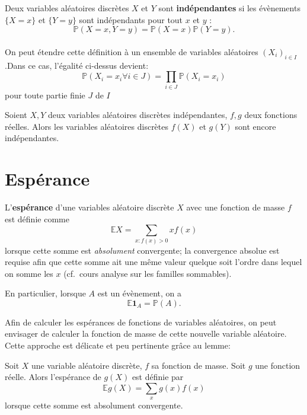 \documentclass[]{book}
\theoremstyle{definition}
\theoremstyle{definition}
\theoremstyle{definition}
\theoremstyle{remark}
\let\BeginKnitrBlock\begin \let\EndKnitrBlock\end
\begin{document}
\BeginKnitrBlock{definition}
\protect\hypertarget{def:unnamed-chunk-8}{}{\label{def:unnamed-chunk-8} }Deux variables aléatoires discrètes \(X\) et \(Y\) sont \textbf{indépendantes} si les évènements \(\lbrace X=x \rbrace\) et \(\lbrace Y=y \rbrace\) sont indépendants pour tout \(x\) et \(y\) :
\[\mathbb{P}(X=x,Y=y) = \mathbb{P}(X=x) \mathbb{P}(Y=y) .\]\\
On peut étendre cette définition à un ensemble de variables aléatoires \((X_i)_{i \in I}\).Dans ce cas, l'égalité ci-dessus devient:
\[ \mathbb{P}(X_i = x_i \forall i \in J) = \prod_{i \in J} \mathbb{P}(X_i = x_i)\]
pour toute partie finie \(J\) de \(I\)
\EndKnitrBlock{definition}

\BeginKnitrBlock{theorem}
\protect\hypertarget{thm:unnamed-chunk-9}{}{\label{thm:unnamed-chunk-9} }Soient \(X,Y\) deux variables aléatoires discrètes indépendantes, \(f,g\) deux fonctions réelles. Alors les variables aléatoires discrètes \(f(X)\) et \(g(Y)\) sont encore indépendantes.
\EndKnitrBlock{theorem}

\hypertarget{espuxe9rance}{%
\section{Espérance}\label{espuxe9rance}}

\BeginKnitrBlock{definition}
\protect\hypertarget{def:unnamed-chunk-10}{}{\label{def:unnamed-chunk-10} }L'\textbf{espérance} d'une variables aléatoire discrète \(X\) avec une fonction de masse \(f\) est définie comme
\[ \mathbb{E} X = \sum_{x : f(x)>0} x f(x) \]
lorsque cette somme est \emph{absolument} convergente; la convergence absolue est requise afin que cette somme ait une même valeur quelque soit l'ordre dans lequel on somme les \(x\) (cf.~cours analyse sur les familles sommables).
\EndKnitrBlock{definition}

En particulier, lorsque \(A\) est un évènement, on a
\[\mathbb{E} \mathbf{1}_A = \mathbb{P}(A).\]

Afin de calculer les espérances de fonctions de variables aléatoires, on peut envisager de calculer la fonction de masse de cette nouvelle variable aléatoire. Cette approche est délicate et peu pertinente grâce au lemme:
\BeginKnitrBlock{lemma}
\protect\hypertarget{lem:unnamed-chunk-11}{}{\label{lem:unnamed-chunk-11} }Soit \(X\) une variable aléatoire discrète, \(f\) sa fonction de masse. Soit \(g\) une fonction réelle. Alors l'espérance de \(g(X)\) est définie par
\[
\mathbb{E} g(X) = \sum_{x} g(x) f(x)
\]
lorsque cette somme est absolument convergente.
\EndKnitrBlock{lemma}
\end{document}
